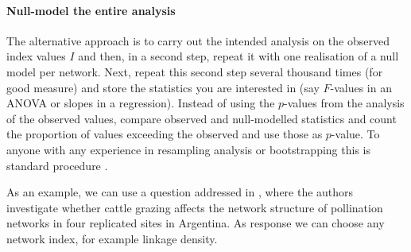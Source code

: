 \documentclass[a4paper, 11pt]{article}\usepackage[]{graphicx}\usepackage[]{color}
\newcommand{\ind}[1]{#1\index{#1}}           			   %
\begin{document}
\paragraph{Null-model the entire analysis}
The alternative approach is to carry out the intended analysis on the observed index values $I$ and then, in a second step, repeat it with one realisation of a null model per network. Next, repeat this second step several thousand times (for good measure) and store the statistics you are interested in (say $F$-values in an ANOVA or slopes in a regression). Instead of using the $p$-values from the analysis of the observed values, compare observed and null-modelled statistics and count the proportion of values exceeding the observed and use those as $p$-value. To anyone with any experience in \ind{resampling analysis} or bootstrapping this is standard procedure \citep{Efron1993,Manly1997}.

As an example, we can use a question addressed in \citet{Vazquez2003}, where the authors investigate whether cattle grazing affects the network structure of pollination networks in four replicated sites in Argentina. As response we can choose any network index, for example linkage density. %
\end{document}
